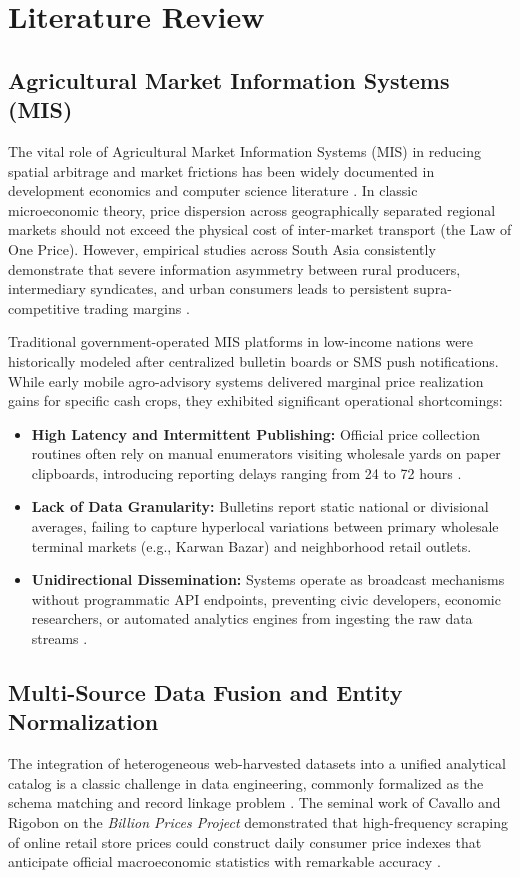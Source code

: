 \chapter{Literature Review}
\label{ch:literature_review}

\section{Agricultural Market Information Systems (MIS)}
The vital role of Agricultural Market Information Systems (MIS) in reducing spatial arbitrage and market frictions has been widely documented in development economics and computer science literature \cite{fao2021amis, minten2010food}. In classic microeconomic theory, price dispersion across geographically separated regional markets should not exceed the physical cost of inter-market transport (the Law of One Price). However, empirical studies across South Asia consistently demonstrate that severe information asymmetry between rural producers, intermediary syndicates, and urban consumers leads to persistent supra-competitive trading margins \cite{baur2013statistical}.

Traditional government-operated MIS platforms in low-income nations were historically modeled after centralized bulletin boards or SMS push notifications. While early mobile agro-advisory systems delivered marginal price realization gains for specific cash crops, they exhibited significant operational shortcomings:
\begin{itemize}
    \item \textbf{High Latency and Intermittent Publishing:} Official price collection routines often rely on manual enumerators visiting wholesale yards on paper clipboards, introducing reporting delays ranging from 24 to 72 hours \cite{dam2024daily}.
    \item \textbf{Lack of Data Granularity:} Bulletins report static national or divisional averages, failing to capture hyperlocal variations between primary wholesale terminal markets (e.g., Karwan Bazar) and neighborhood retail outlets.
    \item \textbf{Unidirectional Dissemination:} Systems operate as broadcast mechanisms without programmatic API endpoints, preventing civic developers, economic researchers, or automated analytics engines from ingesting the raw data streams \cite{blazquez2018big}.
\end{itemize}

\section{Multi-Source Data Fusion and Entity Normalization}
The integration of heterogeneous web-harvested datasets into a unified analytical catalog is a classic challenge in data engineering, commonly formalized as the schema matching and record linkage problem \cite{rahm2001survey}. The seminal work of Cavallo and Rigobon on the \textit{Billion Prices Project} demonstrated that high-frequency scraping of online retail store prices could construct daily consumer price indexes that anticipate official macroeconomic statistics with remarkable accuracy \cite{cavallo2018billion}. 


